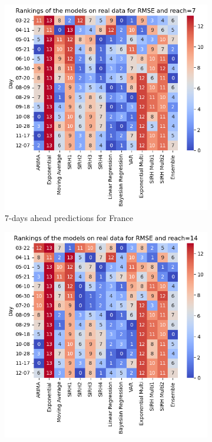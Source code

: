 \begin{figure}[h!]
    \begin{subfigure}[b]{0.45\textwidth}
        \centering
        \includegraphics[width=\textwidth]{figures/heatmap_test_france_7.png} 
        \caption{7-days ahead predictions for France}
        \label{fig:sousfig1gh}
    \end{subfigure}
    \hfill
    \begin{subfigure}[b]{0.45\textwidth}
        \centering
        \includegraphics[width=\textwidth]{figures/heatmap_test_france_14.png} 

\end{subfigure}
\end{figure}
